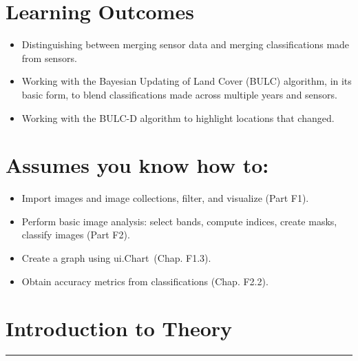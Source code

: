 \documentclass[
  letterpaper,
  DIV=11,
  numbers=noendperiod]{scrreprt}
\providecommand{\tightlist}{%
  \setlength{\itemsep}{0pt}\setlength{\parskip}{0pt}}\usepackage{longtable,booktabs,array}
\begin{document}
\hypertarget{learning-outcomes-15}{%
\section*{Learning Outcomes}\label{learning-outcomes-15}}


\begin{itemize}
\tightlist
\item
  Distinguishing between merging sensor data and merging classifications
  made from sensors.
\item
  Working with the Bayesian Updating of Land Cover (BULC) algorithm, in
  its basic form, to blend classifications made across multiple years
  and sensors.
\item
  Working with the BULC-D algorithm to highlight locations that changed.
\end{itemize}

\hypertarget{assumes-you-know-how-to-15}{%
\section*{Assumes you know how to:}\label{assumes-you-know-how-to-15}}


\begin{itemize}
\tightlist
\item
  Import images and image collections, filter, and visualize (Part F1).
\item
  Perform basic image analysis: select bands, compute indices, create
  masks, classify images (Part F2).
\item
  \hspace{0pt}\hspace{0pt}Create a graph using ui.Chart~(Chap. F1.3).
\item
  Obtain accuracy metrics from classifications (Chap. F2.2).
\end{itemize}

\hypertarget{introduction-to-theory-10}{%
\section*{Introduction to Theory}\label{introduction-to-theory-10}}


\begin{center}\rule{0.5\linewidth}{0.5pt}\end{center}
\end{document}
